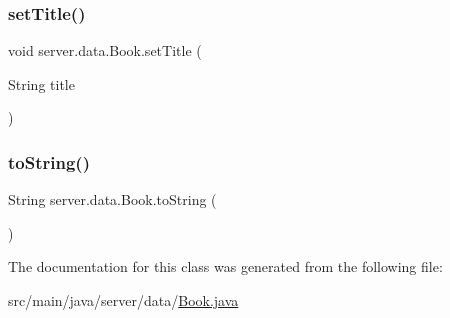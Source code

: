 \mbox{\label{classserver_1_1data_1_1_book_aaab2ea46310686520765773057d0f511}} 
\subsubsection{\texorpdfstring{set\+Title()}{setTitle()}}
{\footnotesize\ttfamily void server.\+data.\+Book.\+set\+Title (\begin{DoxyParamCaption}\item[{String}]{title }\end{DoxyParamCaption})}

\mbox{\label{classserver_1_1data_1_1_book_ae63b18e3c565ce684821eb4c42f4631c}} 
\subsubsection{\texorpdfstring{to\+String()}{toString()}}
{\footnotesize\ttfamily String server.\+data.\+Book.\+to\+String (\begin{DoxyParamCaption}{ }\end{DoxyParamCaption})}



The documentation for this class was generated from the following file\+:\begin{DoxyCompactItemize}
\item 
src/main/java/server/data/\hyperlink{_book_8java}{Book.\+java}\end{DoxyCompactItemize}
